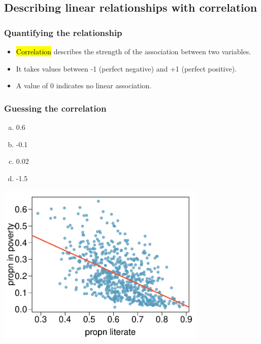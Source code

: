 \documentclass[notes,11pt, aspectratio=169]{beamer}
\begin{document}

\subsection{Describing linear relationships with correlation}


\begin{frame}
\frametitle{Quantifying the relationship}

\begin{itemize}

\item \hl{Correlation} describes the strength of the  association between two variables.

\pause

\item It takes values between -1 (perfect negative) and +1 (perfect positive).

\pause

\item A value of 0 indicates no linear association.

\end{itemize}

\end{frame}


\begin{frame}
\frametitle{Guessing the correlation}

{
\begin{enumerate}[(a)]
\item 0.6
\item -0.1
\item 0.02
\item -1.5
\end{enumerate}
}
{
\begin{center}
\includegraphics[width=0.75\textwidth]{graphs/l08f05}
\end{center}
}

\end{frame}
\end{document}
